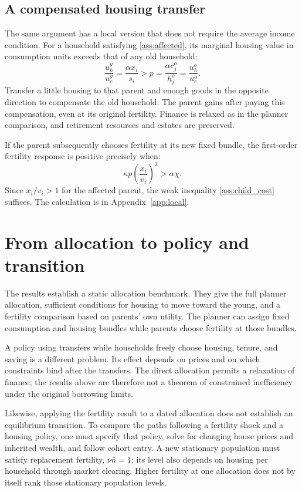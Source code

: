\documentclass[11pt]{article}
\begin{document}
\subsection{A compensated housing transfer}

The same argument has a local version that does not require the average
income condition. For a household satisfying \eqref{ass:affected}, its
marginal housing value in consumption units exceeds that of any old household:
\begin{equation}
\frac{u_h^y}{u_c^y}=\frac{\alpha x_i}{s_i}>p
 =\frac{\alpha c_j^o}{h_j^o}=\frac{u_h^o}{u_c^o}.
\label{eq:local_mrs}
\end{equation}
Transfer a little housing to that parent and enough goods in the opposite
direction to compensate the old household. The parent gains after paying
this compensation, even at its original fertility. Finance is relaxed as in
the planner comparison, and retirement resources and estates are preserved.

If the parent subsequently chooses fertility at its new fixed bundle, the
first-order fertility response is positive precisely when:
\begin{equation}
\kappa p\left(\frac{x_i}{v_i}\right)^2>\alpha\chi.
\label{eq:local_fertility}
\end{equation}
Since $x_i/v_i>1$ for the affected parent, the weak inequality
\eqref{ass:child_cost} suffices. The calculation is in
Appendix~\ref{app:local}.

\section{From allocation to policy and transition}

The results establish a static allocation benchmark. They give the full
planner allocation, sufficient conditions for housing to move toward the
young, and a fertility comparison based on parents' own utility. The planner
can assign fixed consumption and housing bundles while parents choose fertility
at those bundles.

A policy using transfers while households freely choose housing, tenure, and
saving is a different problem. Its effect depends on prices and on which
constraints bind after the transfers. The direct allocation permits a
relaxation of finance; the results above are therefore not a theorem of
constrained inefficiency under the original borrowing limits.

Likewise, applying the fertility result to a dated allocation does not establish
an equilibrium transition. To compare the paths following a fertility shock
and a housing policy, one must specify that policy, solve for changing house
prices and inherited wealth, and follow cohort entry. A new stationary
population must satisfy replacement fertility, $\nu\bar n=1$; its level also
depends on housing per household through market clearing. Higher fertility at
one allocation does not by itself rank those stationary population levels.
\end{document}
